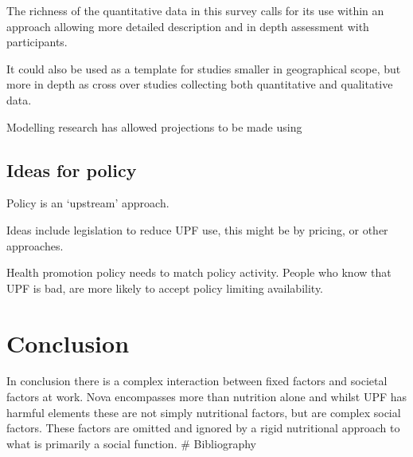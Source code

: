 \documentclass[
]{article}
\begin{document}
The richness of the quantitative data in this survey calls for its use
within an approach allowing more detailed description and in depth
assessment with participants.

It could also be used as a template for studies smaller in geographical
scope, but more in depth as cross over studies collecting both
quantitative and qualitative data.

Modelling research has allowed projections to be made using

\hypertarget{ideas-for-policy}{%
\subsection{Ideas for policy}\label{ideas-for-policy}}

Policy is an `upstream' approach.

Ideas include legislation to reduce UPF use, this might be by pricing,
or other approaches.

Health promotion policy needs to match policy activity. People who know
that UPF is bad, are more likely to accept policy limiting availability.

\newpage

\hypertarget{conclusion}{%
\section{Conclusion}\label{conclusion}}

In conclusion there is a complex interaction between fixed factors and
societal factors at work. Nova encompasses more than nutrition alone and
whilst UPF has harmful elements these are not simply nutritional
factors, but are complex social factors. These factors are omitted and
ignored by a rigid nutritional approach to what is primarily a social
function. \newpage \# Bibliography
\end{document}
